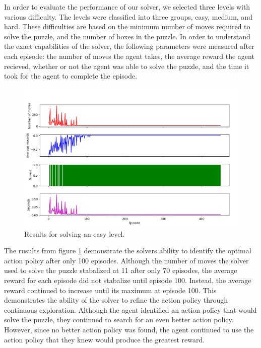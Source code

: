 \documentclass[times, 10pt,twocolumn]{article}
\begin{document}

In order to evaluate the performance of our solver, we selected three levels with various difficulty. The levels were classified into three groups, easy, medium, and hard. These difficulties are based on the minimum number of moves required to solve the puzzle, and the number of boxes in the puzzle. In order to understand the exact capabilities of the solver, the following parameters were measured after each episode: the number of moves the agent takes, the average reward the agent recieved, whether or not the agent was able to solve the puzzle, and the time it took for the agent to complete the episode. 

\begin{figure}[h] 
  \centering
     \includegraphics[width=\linewidth]{images/easy_graph.png}
  \caption{Results for solving an easy level.}
  \label{fig:e}
\end{figure}

The rusults from figure \ref{fig:e} demonstrate the solvers ability to identify the optimal action policy after only 100 episodes. Although the number of moves the solver used to solve the puzzle stabalized at 11 after only 70 episodes, the average reward for each episode did not stabalize until episode 100. Instead, the average reward continued to increase until its maximum at episode 100. This demonstrates the ability of the solver to refine the action policy through continuous exploration. Although the agent identified an action policy that would solve the puzzle, they continued to search for an even better action policy. However, since no better action policy was found, the agent continued to use the action policy that they knew would produce the greatest reward. 
\end{document}
